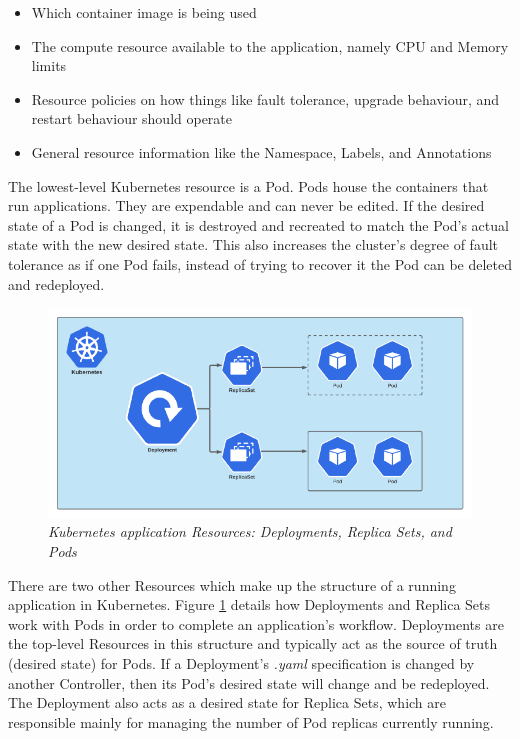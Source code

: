 \documentclass{article}
\begin{document}
\begin{itemize}
    \itemsep0em 
    \item Which container image is being used
    \item The compute resource available to the application, namely CPU and Memory limits
    \item Resource policies on how things like fault tolerance, upgrade behaviour, and restart behaviour should operate
    \item General resource information like the Namespace, Labels, and Annotations
\end{itemize}

The lowest-level Kubernetes resource is a Pod. Pods house the containers that run applications. They are expendable and can never be edited. If the desired state of a Pod is changed, it is destroyed and recreated to match the Pod's actual state with the new desired state. This also increases the cluster's degree of fault tolerance as if one Pod fails, instead of trying to recover it the Pod can be deleted and redeployed. 

\begin{figure}[H]
    \centering
    \includegraphics[width=160mm]{tech/resource-struct.png}
    \caption{\emph{Kubernetes application Resources: Deployments, Replica Sets, and Pods}}
    \label{resource-struct}
\end{figure}

There are two other Resources which make up the structure of a running application in Kubernetes. Figure \ref{resource-struct} \cite{k8s-rolling} details how Deployments and Replica Sets work with Pods in order to complete an application's workflow. Deployments are the top-level Resources in this structure and typically act as the source of truth (desired state) for Pods. If a Deployment's \emph{.yaml} specification is changed by another Controller, then its Pod's desired state will change and be redeployed. The Deployment also acts as a desired state for Replica Sets, which are responsible mainly for managing the number of Pod replicas currently running. 
\end{document}
